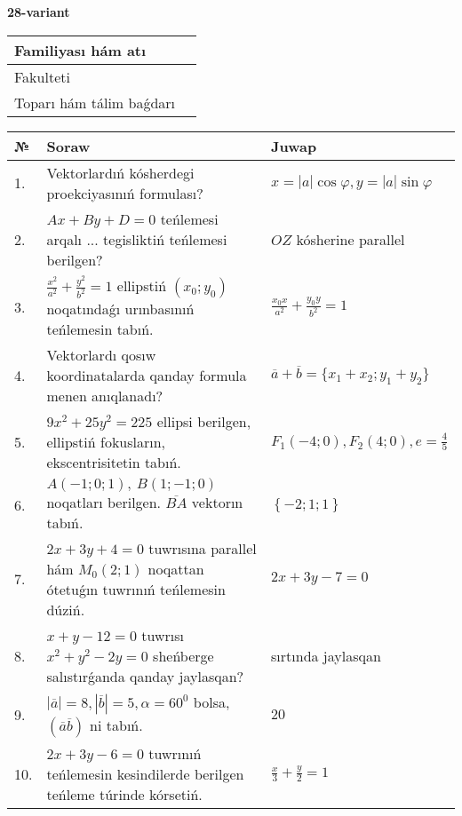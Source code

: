 \documentclass{article}
\begin{document}
\newpage


\textbf{28-variant}\\

\bgroup
\def\arraystretch{1.6} %

\begin{tabular}{|m{5.7cm}|m{9.5cm}|}
\hline
Familiyası hám atı & \\
\hline
Fakulteti  & \\
\hline
Toparı hám tálim baǵdarı  & \\
\hline
\end{tabular}

\vspace{1cm}

\begin{tabular}{|m{0.7cm}|m{10cm}|m{4cm}|}
\hline
№ & Soraw & Juwap \\
\hline
1. & Vektorlardıń kósherdegi proekciyasınıń formulası? & $x=|a|\cos\varphi, y=|a|\sin\varphi$ \\
\hline
2. & $Ax+By+D=0$ teńlemesi arqalı ... tegisliktiń teńlemesi berilgen? & $OZ$ kósherine parallel \\
\hline
3. & $\frac{x^2}{a^2}+\frac{y^2}{b^2}=1$ ellipstiń $(x_0;y_0)$ noqatındaǵı urınbasınıń teńlemesin tabıń. & $\frac{x_0x}{a^2}+\frac{y_0y}{b^2}=1$ \\
\hline
4. & Vektorlardı qosıw koordinatalarda qanday formula menen anıqlanadı? & $\overline{a}+\overline{b}=\{x_1+x_2;y_1+y_2\}$ \\
\hline
5. & $9x^{2}+25y^{2}=225$ ellipsi berilgen, ellipstiń fokusların, ekscentrisitetin tabıń. & $F_1\left(-4;0 \right) , F_2\left( 4;0 \right) , e = \frac{4}{5}$ \\
\hline
6. & $A (-1;0;1),\ B (1;-1;0)$ noqatları berilgen. $\overline{BA}$ vektorın tabıń. & $\left\{ - 2;1;1 \right\}$ \\
\hline
7. & $2x+3y+4=0$ tuwrısına parallel hám $M_{0} (2;1)$ noqattan ótetuǵın tuwrınıń teńlemesin dúziń. & $2x+3y-7=0$ \\
\hline
8. & $x+y-12=0$ tuwrısı $x^{2}+y^{2}-2y=0$ sheńberge salıstırǵanda qanday jaylasqan? & sırtında jaylasqan \\
\hline
9. & $\left| \overline{a} \right|=8, \left| \overline{b} \right|=5, \alpha=60^{0}$ bolsa, $( \overline{a}\overline{b} )$ ni tabıń. & $20$ \\
\hline
10. & $2x+3y-6=0$ tuwrınıń teńlemesin kesindilerde berilgen teńleme túrinde kórsetiń. & $\frac{x}{3} + \frac{ y }{ 2 } =  1$ \\
\hline
\end{tabular}
\end{document}
